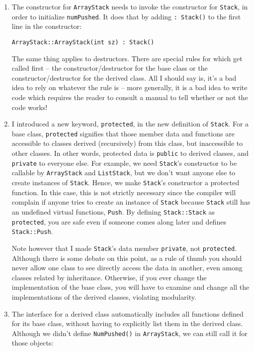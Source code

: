 \begin{enumerate}

\item The constructor for {\tt ArrayStack} needs to invoke the
constructor for {\tt Stack}, in order to initialize {\tt numPushed}.
It does that by adding {\tt : Stack()} to the first line in the constructor:

\begin{verbatim}
ArrayStack::ArrayStack(int sz) : Stack()
\end{verbatim}

The same thing applies to destructors.  There are special rules for which 
get called first -- the constructor/destructor for the base class or 
the constructor/destructor for the derived class.  All I should say is,
it's a bad idea to rely on whatever the rule is -- more generally, it is a 
bad idea to write code which requires the reader to consult a manual 
to tell whether or not the code works!

\item I introduced a new keyword, {\tt protected}, in the new definition
of {\tt Stack}.  For a base class, {\tt protected} signifies that those
member data and functions are accessible to classes derived (recursively)
from this class, but inaccessible to other classes.  In other words, protected
data is {\tt public} to derived classes, and {\tt private} to everyone else.
For example, we need {\tt Stack}'s constructor to be callable by 
{\tt ArrayStack} and {\tt ListStack}, but we don't want anyone
else to create instances of {\tt Stack}.  Hence, we make {\tt Stack}'s 
constructor a protected function.  In this case, this is not strictly
necessary since the compiler will complain if anyone tries to create an
instance of {\tt Stack} because {\tt Stack} still has an undefined virtual 
functions, {\tt Push}.  By defining {\tt Stack::Stack} as {\tt protected}, 
you are safe even if someone comes along later and defines {\tt Stack::Push}.

Note however that I made {\tt Stack}'s data member {\tt private}, not
{\tt protected}.  Although there is some debate on this point,
as a rule of thumb you should never allow one class to see directly
access the data in another, even among classes related
by inheritance.  Otherwise, if you ever change the implementation
of the base class, you will have to examine and change all the 
implementations of the derived classes, violating modularity.

\item The interface for a derived class automatically includes all
functions defined for its base class, without having to explicitly 
list them in the derived class.  Although we didn't define 
{\tt NumPushed()} in {\tt ArrayStack}, we can still call it for 
those objects:


\end{enumerate}
